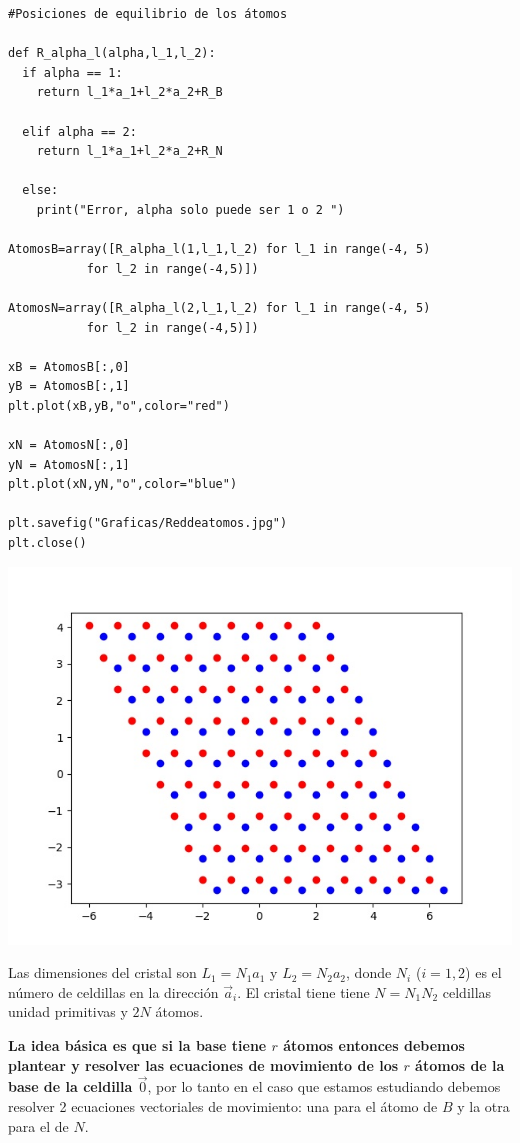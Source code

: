 \documentclass[12pt,a4paper]{article}
\begin{document}
\begin{minipage}{0.55\textwidth}
\begin{verbatim}
#Posiciones de equilibrio de los átomos

def R_alpha_l(alpha,l_1,l_2):
  if alpha == 1:
    return l_1*a_1+l_2*a_2+R_B

  elif alpha == 2:
    return l_1*a_1+l_2*a_2+R_N

  else:
    print("Error, alpha solo puede ser 1 o 2 ")

AtomosB=array([R_alpha_l(1,l_1,l_2) for l_1 in range(-4, 5)
	       for l_2 in range(-4,5)])

AtomosN=array([R_alpha_l(2,l_1,l_2) for l_1 in range(-4, 5)
	       for l_2 in range(-4,5)])

xB = AtomosB[:,0]
yB = AtomosB[:,1]
plt.plot(xB,yB,"o",color="red")

xN = AtomosN[:,0]
yN = AtomosN[:,1]
plt.plot(xN,yN,"o",color="blue")

plt.savefig("Graficas/Reddeatomos.jpg")
plt.close()
\end{verbatim}

\end{minipage}\begin{minipage}{0.6\textwidth}
\begin{center}
\includegraphics[width=6 cm]{Graficas/Reddeatomos.jpg}
\end{center}
\end{minipage}

\vspace{0.5cm}
Las dimensiones del cristal son \(L_1=N_1 a_1\) y \(L_2=N_2 a_2\), donde \(N_i\) (\(i=1,2\)) es el número de celdillas en la dirección \(\vec a_i\). El cristal tiene tiene \(N=N_1N_2\) celdillas unidad primitivas y \(2N\) átomos.


\textbf{La idea básica es que si la base tiene \(r\) átomos entonces debemos plantear y resolver las ecuaciones de movimiento de los \(r\) átomos de la base de la celdilla \(\vec 0\)}, por lo tanto en el caso que estamos estudiando debemos resolver 2 ecuaciones vectoriales de movimiento: una para el átomo de \(B\) y la otra para el de \(N\).
\end{document}
